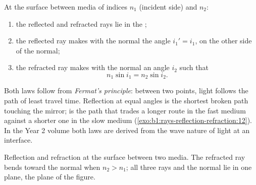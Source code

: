 \begin{theorem}\label{thm:b1:rays-reflection-refraction:snell}
At the surface between media of indices $n_1$ (incident side) and
$n_2$:
\begin{enumerate}
  \item the reflected and refracted rays lie in the ;
  \item the reflected ray makes with the normal the angle $i_1' = i_1$,
        on the other side of the normal;
  \item the refracted ray makes with the normal an angle $i_2$ such that
        \[
        n_1 \sin i_1 = n_2 \sin i_2 .
        \]
\end{enumerate}
\end{theorem}
\admitted

\begin{remark}\label{rem:b1:rays-reflection-refraction:fermat}
Both laws follow from \emph{Fermat's principle}: between two points,
light follows the path of least travel time. Reflection at equal angles
is the shortest broken path touching the mirror;  is the
path that trades a longer route in the fast medium against a shorter
one in the slow medium (\cref{exo:b1:rays-reflection-refraction:12}).
In the Year 2 volume both laws are derived from the wave nature of light
at an interface.
\end{remark}

\begin{omfigure}

{\small Reflection and refraction at the surface between two media.
The refracted ray bends toward the normal when $n_2 > n_1$; all three
rays and the normal lie in one plane, the plane of the figure.}
\end{omfigure}

